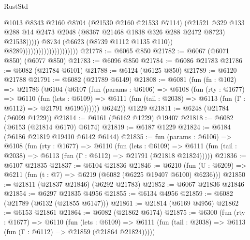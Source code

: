 \begin{lexlean}{RustStd}
\begin{coremodule}
                                                      @1013
                                                      @8343
                                                      @2160
                                                      @8704
                                                      (@21530 @2160 @21533 @7114)
                                                      (@21521
                                                        @329
                                                        @133
                                                        @288
                                                        @14
                                                        @2473
                                                        @2048
                                                        (@8367 @21468 @1838 @326 @288 @2472 @8723)
                                                        @21538)))))
                                              @8734
                                              (@6623 (@8739 @1112 @1135 @110))
                                              @8289)))))))))))))))))))))
@21778 := @6065 @850
@21782 := @6067 (@6071 @850) (@6077 @850)
@21783 := @6096 @850
@21784 := @6086 @21783
@21786 := @6082 (@21784 @6101)
@21788 := @6124 (@6125 @850)
@21789 := @6120 @21788
@21791 := @6082 (@21789 @6149)
@21808 := @6081
    (fun (fn : @102) =>
    @21786
      (@6104
        (@6107
          (fun (params : @6106) =>
          @6108
            (fun (rty : @1677) =>
            @6110
              (fun (lets : @6109) =>
              @6111 (fun (tail : @2038) => @6113 (fun (Γ : @6112) => @21791 @6196))))))
        @6242))
    @1229
@21811 := @6248 (@21784 (@6099 @1229))
@21814 := @6161 (@6162 @1229) @19407
@21818 := @6082 (@6153 (@21814 @6170) @6174)
@21819 := @6187 @1229
@21824 := @6184 (@6186 @21819 @19410 @6142 @6144)
@21835 := fun (params : @6106) =>
  @6108
    (fun (rty : @1677) =>
    @6110
      (fun (lets : @6109) =>
      @6111 (fun (tail : @2038) => @6113 (fun (Γ : @6112) => @21791 (@21818 @21824)))))
@21836 := @6107 @21835
@21837 := @6104 @21836
@21846 := @6210
    (fun (U : @6209) => @6211 (fun (t : @7) => @6219 (@6082 (@6225 @19407 @6100) @6236)))
@21850 := @21811 (@21837 @21846) (@6292 @21783)
@21852 := @6067 @21836 @21846
@21854 := @6297 @21835 @4956
@21855 := @6134 @4956
@21859 := @6082 (@21789 (@6132 (@21855 @6147)))
@21861 := @21814 (@6169 @4956)
@21862 := @6153 @21861
@21864 := @6082 (@21862 @6174)
@21875 := @6300
    (fun (rty : @1677) =>
    @6110
      (fun (lets : @6109) =>
      @6111 (fun (tail : @2038) => @6113 (fun (Γ : @6112) => @21859 (@21864 @21824)))))

\end{coremodule}
\end{lexlean}
